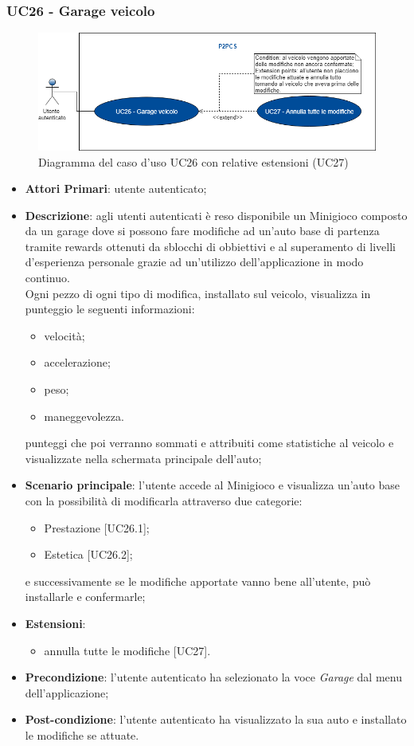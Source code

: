 \subsubsection{UC26 - Garage veicolo}
\begin{figure}[h]
	\includegraphics[width=13cm]{res/images/UC26Garage.png}
	\centering
	\caption{Diagramma del caso d'uso UC26 con relative estensioni (UC27)}
\end{figure}
\begin{itemize}
	\item \textbf{Attori Primari}: utente autenticato;
	\item \textbf{Descrizione}: agli utenti autenticati è reso disponibile un Minigioco composto da un garage dove si possono fare modifiche ad un'auto base di partenza tramite rewards ottenuti da sblocchi di obbiettivi e al superamento di livelli d'esperienza personale grazie ad un'utilizzo dell'applicazione in modo continuo. \\ Ogni pezzo di ogni tipo di modifica, installato sul veicolo, visualizza in punteggio le seguenti informazioni:
	\begin{itemize}
		\item velocità;
		\item accelerazione;
		\item peso;
		\item maneggevolezza.
	\end{itemize}
	punteggi che poi verranno sommati e attribuiti come statistiche al veicolo e visualizzate nella schermata principale dell'auto; 
	\item \textbf{Scenario principale}: l'utente accede al Minigioco e visualizza un'auto base con la possibilità di modificarla attraverso due categorie:
	\begin{itemize}
		\item Prestazione [UC26.1];
		\item Estetica [UC26.2];
	\end{itemize}
	e successivamente se le modifiche apportate vanno bene all'utente, può installarle e confermarle;
	\item \textbf{Estensioni}:
	\begin{itemize}
		\item annulla tutte le modifiche [UC27].
	\end{itemize}
	\item \textbf{Precondizione}: l'utente autenticato ha selezionato la voce \textit{Garage} dal menu dell'applicazione;
	\item \textbf{Post-condizione}: l'utente autenticato ha visualizzato la sua auto e installato le modifiche se attuate. 
\end{itemize}

